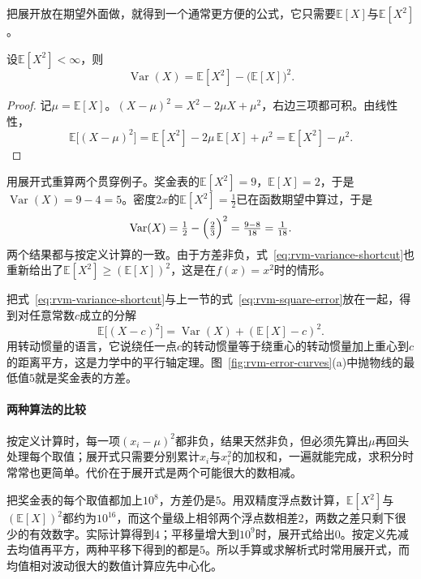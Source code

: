 把展开放在期望外面做，就得到一个通常更方便的公式，它只需要$\mathbb{E}[X]$与$\mathbb{E}[X^{2}]$。

\begin{theorem}[方差的展开式]
\label{thm:rvm-variance-shortcut}
设$\mathbb{E}[X^{2}]<\infty$，则
\begin{equation}
 \operatorname{Var}(X)=\mathbb{E}[X^{2}]-\bigl(\mathbb{E}[X]\bigr)^{2} .
 \label{eq:rvm-variance-shortcut}
\end{equation}
\end{theorem}

\begin{proof}
记$\mu=\mathbb{E}[X]$。$(X-\mu)^{2}=X^{2}-2\mu X+\mu^{2}$，右边三项都可积。由线性性，
\[
 \mathbb{E}\bigl[(X-\mu)^{2}\bigr]=\mathbb{E}[X^{2}]-2\mu\,\mathbb{E}[X]+\mu^{2}=\mathbb{E}[X^{2}]-\mu^{2} .
\]
\end{proof}

用展开式重算两个贯穿例子。奖金表的$\mathbb{E}[X^{2}]=9$，$\mathbb{E}[X]=2$，于是$\operatorname{Var}(X)=9-4=5$。密度$2x$的$\mathbb{E}[X^{2}]=\tfrac12$已在函数期望中算过，于是
\[
 \operatorname{Var}(X)=\tfrac12-\Bigl(\tfrac23\Bigr)^{2}=\tfrac{9-8}{18}=\tfrac{1}{18} .
\]
两个结果都与按定义计算的一致。由于方差非负，式~\eqref{eq:rvm-variance-shortcut}也重新给出了$\mathbb{E}[X^{2}]\geq(\mathbb{E}[X])^{2}$，这是在$f(x)=x^{2}$时的情形。

把式~\eqref{eq:rvm-variance-shortcut}与上一节的式~\eqref{eq:rvm-square-error}放在一起，得到对任意常数$c$成立的分解
\begin{equation}
 \mathbb{E}\bigl[(X-c)^{2}\bigr]=\operatorname{Var}(X)+(\mathbb{E}[X]-c)^{2} .
 \label{eq:rvm-parallel-axis}
\end{equation}
用转动惯量的语言，它说绕任一点$c$的转动惯量等于绕重心的转动惯量加上重心到$c$的距离平方，这是力学中的平行轴定理。图~\ref{fig:rvm-error-curves}(a)中抛物线的最低值$5$就是奖金表的方差。

\paragraph{两种算法的比较}
按定义计算时，每一项$(x_i-\mu)^{2}$都非负，结果天然非负，但必须先算出$\mu$再回头处理每个取值；展开式只需要分别累计$x_i$与$x_i^{2}$的加权和，一遍就能完成，求积分时常常也更简单。代价在于展开式是两个可能很大的数相减。

把奖金表的每个取值都加上$10^{8}$，方差仍是$5$。用双精度浮点数计算，$\mathbb{E}[X^{2}]$与$(\mathbb{E}[X])^{2}$都约为$10^{16}$，而这个量级上相邻两个浮点数相差$2$，两数之差只剩下很少的有效数字。实际计算得到$4$；平移量增大到$10^{9}$时，展开式给出$0$。按定义先减去均值再平方，两种平移下得到的都是$5$。所以手算或求解析式时常用展开式，而均值相对波动很大的数值计算应先中心化。

